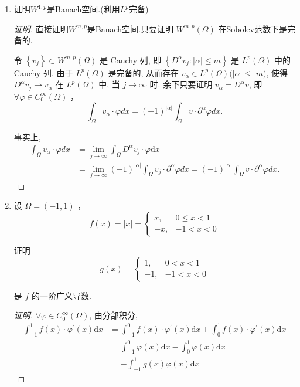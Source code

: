 \documentclass[12pt,a4paper]{article}
\begin{document}
\begin{enumerate}
\begin{proof}[证明]
		\end{proof}
		
		\item 证明$W^{1,p}$是Banach空间.(利用$L^p$完备)
		
		\begin{proof}[证明]
			
			直接证明$W^{m,p}$是Banach空间.只要证明 $W^{m, p}(\Omega)$ 在Sobolev范数下是完备的.
			
			令 $\left\{v_j\right\} \subset W^{m, p}(\Omega)$ 是 Cauchy 列, 即 $\left\{D^\alpha v_j:|\alpha| \leq m\right\}$ 是 $L^p(\Omega)$ 中的 Cauchy 列. 由于 $L^p(\Omega)$ 是完备的, 从而存在 $v_\alpha \in L^p(\Omega)(|\alpha| \leq$ $m)$, 使得 $D^\alpha v_j \rightarrow v_\alpha$ 在 $L^p(\Omega)$ 中, 当 $j \rightarrow \infty$ 时. 余下只要证明 $v_\alpha=D^\alpha v$, 即 $\forall \varphi \in C_0^{\infty}(\Omega)$ ，
			$$
			\int_{\Omega} v_\alpha \cdot \varphi d x=(-1)^{|\alpha|} \int_{\Omega} v \cdot \partial^\alpha \varphi d x .
			$$
			
			事实上,
			$$
			\begin{aligned}
				\int_{\Omega} v_\alpha \cdot \varphi d x & =\lim _{j \rightarrow \infty} \int_{\Omega} D^\alpha v_j \cdot \varphi \mathrm{d} x \\
				& =\lim _{j \rightarrow \infty}(-1)^{|\alpha|} \int_{\Omega} v_j \cdot \partial^\alpha \varphi d x=(-1)^{|\alpha|} \int_{\Omega} v \cdot \partial^\alpha \varphi d x.
			\end{aligned}
			$$
		\end{proof}
		
		\item 设 $\Omega=(-1,1)$ ，
		$$
		f(x)=|x|= \begin{cases}x, & 0 \leq x<1 \\ -x, & -1<x<0\end{cases}
		$$
		
		证明
		$$
		g(x)= \begin{cases}1, & 0<x<1 \\ -1, & -1<x<0\end{cases}
		$$
		
		是 $f$ 的一阶广义导数.
		
		\begin{proof}[证明]
			$\forall \varphi \in C_0^{\infty}(\Omega)$, 由分部积分,
			$$
			\begin{aligned}
				\int_{-1}^1 f(x) \cdot \varphi^{\prime}(x) \mathrm{d} x & =\int_{-1}^0 f(x) \cdot \varphi^{\prime}(x) \mathrm{d} x+\int_0^1 f(x) \cdot \varphi^{\prime}(x) \mathrm{d} x \\
				& =\int_{-1}^0 \varphi(x) \mathrm{d} x-\int_0^1 \varphi(x) \mathrm{d} x \\
				& =-\int_{-1}^1 g(x) \varphi(x) \mathrm{d} x
			\end{aligned}
			$$
			

\end{proof}
\end{enumerate}
\end{document}
